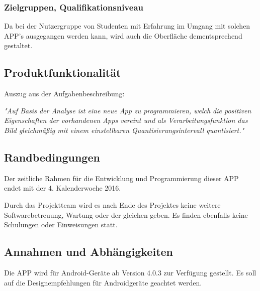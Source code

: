 \subsubsection{Zielgruppen, Qualifikationsniveau}

Da bei der Nutzergruppe von Studenten mit Erfahrung im Umgang mit solchen APP's ausgegangen werden kann, wird auch die Oberfläche dementsprechend gestaltet.

\subsection{\textbf{Produktfunktionalität}}

Auszug aus der Aufgabenbeschreibung:

\textit{"Auf Basis der Analyse ist eine neue App zu programmieren,
welch die positiven Eigenschaften der vorhandenen Apps vereint und als Verarbeitungsfunktion
das Bild gleichmäßig mit einem einstellbaren Quantisierungsintervall quantisiert."} 

\subsection{\textbf{Randbedingungen}}

Der zeitliche Rahmen für die Entwicklung und Programmierung dieser APP endet mit der 4. Kalenderwoche 2016.

Durch das Projektteam wird es nach Ende des Projektes keine weitere Softwarebetreuung, Wartung oder der gleichen geben. Es finden ebenfalls keine Schulungen oder Einweisungen statt.

\subsection{\textbf{Annahmen und Abhängigkeiten}}

Die APP wird für Android-Geräte ab Version 4.0.3 zur Verfügung gestellt. Es soll auf die Designempfehlungen für Androidgeräte geachtet werden.

%

